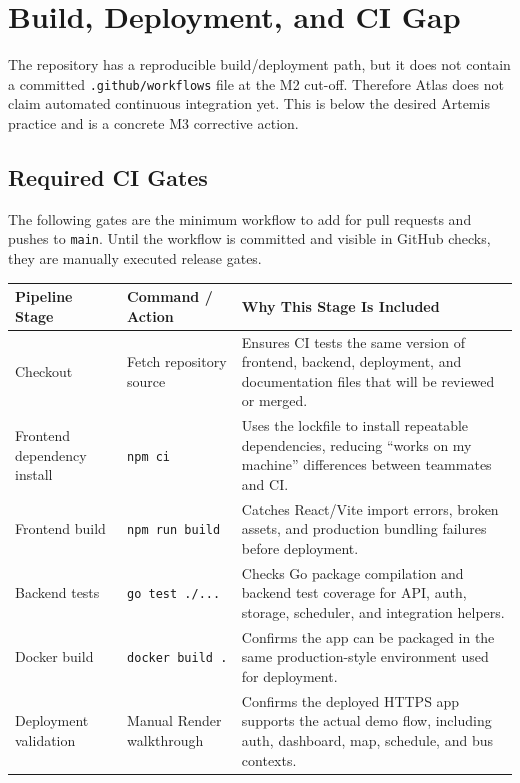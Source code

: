 \documentclass[11pt]{article}
\begin{document}
\newpage

\section*{Build, Deployment, and CI Gap}

The repository has a reproducible build/deployment path, but it does not contain a committed \texttt{.github/workflows} file at the M2 cut-off. Therefore Atlas does not claim automated continuous integration yet. This is below the desired Artemis practice and is a concrete M3 corrective action.

\subsection*{Required CI Gates}

The following gates are the minimum workflow to add for pull requests and pushes to \texttt{main}. Until the workflow is committed and visible in GitHub checks, they are manually executed release gates.

\begin{center}
\renewcommand{\arraystretch}{1.35}
\begin{tabularx}{\textwidth}{|L{0.24\textwidth}|L{0.28\textwidth}|X|}
\hline
\textbf{Pipeline Stage} & \textbf{Command / Action} & \textbf{Why This Stage Is Included} \\
\hline
Checkout & Fetch repository source & Ensures CI tests the same version of frontend, backend, deployment, and documentation files that will be reviewed or merged. \\
\hline
Frontend dependency install & \texttt{npm ci} & Uses the lockfile to install repeatable dependencies, reducing ``works on my machine'' differences between teammates and CI. \\
\hline
Frontend build & \texttt{npm run build} & Catches React/Vite import errors, broken assets, and production bundling failures before deployment. \\
\hline
Backend tests & \texttt{go test ./...} & Checks Go package compilation and backend test coverage for API, auth, storage, scheduler, and integration helpers. \\
\hline
Docker build & \texttt{docker build .} & Confirms the app can be packaged in the same production-style environment used for deployment. \\
\hline
Deployment validation & Manual Render walkthrough & Confirms the deployed HTTPS app supports the actual demo flow, including auth, dashboard, map, schedule, and bus contexts. \\
\hline
\end{tabularx}
\end{center}
\end{document}
